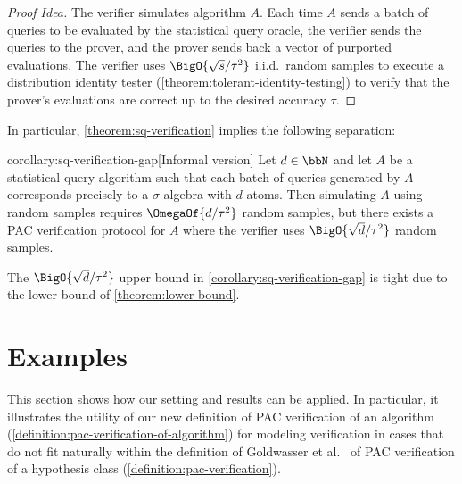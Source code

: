 \begin{proof}[Proof Idea]
	The verifier simulates algorithm $A$. Each time $A$ sends a batch of queries to be evaluated by the statistical query oracle, the verifier sends the queries to the prover, and the prover sends back a vector of purported evaluations. The verifier uses $\BigO{\sqrt{s}/\tau^2}$ i.i.d.\ random samples to execute a distribution identity tester (\cref{theorem:tolerant-identity-testing}) to verify that the prover's evaluations are correct up to the desired accuracy $\tau$.
\end{proof}

In particular, \cref{theorem:sq-verification} implies the following separation:

\begin{repcorollary}{corollary:sq-verification-gap}[Informal version]
	Let $d \in \bbN$ and let $A$ be a statistical query algorithm such that each batch of queries generated by $A$ corresponds precisely to a $\sigma$-algebra with $d$ atoms. Then simulating $A$ using random samples requires $\OmegaOf{d/\tau^2}$ random samples, but there exists a PAC verification protocol for $A$ where the verifier uses $\BigO{\sqrt{d}/\tau^2}$ random samples.
\end{repcorollary}

The $\BigO{\sqrt{d}/\tau^2}$ upper bound in \cref{corollary:sq-verification-gap} is tight due to the lower bound of \cref{theorem:lower-bound}.


\section{Examples}

This section shows how our setting and results can be applied. In particular, it illustrates the utility of our new definition of PAC verification of an algorithm (\cref{definition:pac-verification-of-algorithm}) for modeling verification in cases that do not fit naturally within the definition of Goldwasser et al.\ \cite{GoldwasserRSY21} of PAC verification of a hypothesis class (\cref{definition:pac-verification}).


